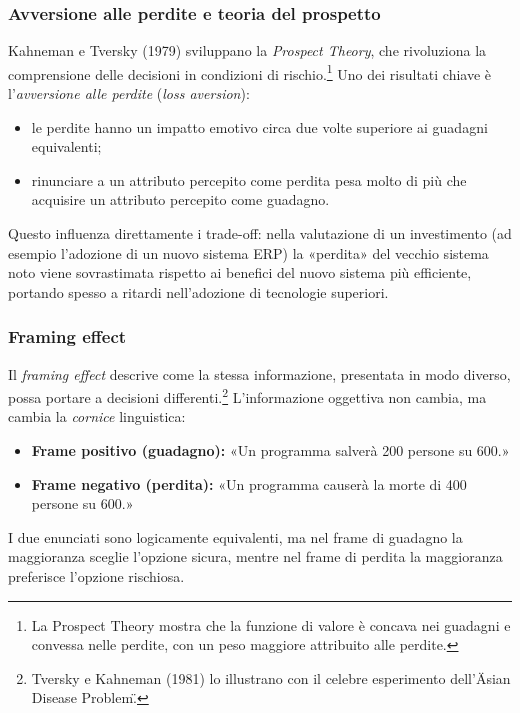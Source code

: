 \documentclass[a4paper,12pt]{article}
\begin{document}
	\subsubsection{Avversione alle perdite e teoria del prospetto}
	
	Kahneman e Tversky (1979) sviluppano la \emph{Prospect Theory}, che rivoluziona la comprensione delle decisioni in condizioni di rischio.\footnote{La Prospect Theory mostra che la funzione di valore è concava nei guadagni e convessa nelle perdite, con un peso maggiore attribuito alle perdite. }%
	Uno dei risultati chiave è l'\emph{avversione alle perdite} (\emph{loss aversion}):
	\begin{itemize}
		\item le perdite hanno un impatto emotivo circa due volte superiore ai guadagni equivalenti;
		\item rinunciare a un attributo percepito come perdita pesa molto di più che acquisire un attributo percepito come guadagno.
	\end{itemize}
	
	Questo influenza direttamente i trade-off: nella valutazione di un investimento (ad esempio l'adozione di un nuovo sistema ERP) la «perdita» del vecchio sistema noto viene sovrastimata rispetto ai benefici del nuovo sistema più efficiente, portando spesso a ritardi nell'adozione di tecnologie superiori. %
	
	\subsubsection{Framing effect}
	
	Il \emph{framing effect} descrive come la stessa informazione, presentata in modo diverso, possa portare a decisioni differenti.\footnote{Tversky e Kahneman (1981) lo illustrano con il celebre esperimento dell'\"Asian Disease Problem\". }%
	L'informazione oggettiva non cambia, ma cambia la \emph{cornice} linguistica:
	
	\begin{itemize}
		\item \textbf{Frame positivo (guadagno):} «Un programma salverà 200 persone su 600.»
		\item \textbf{Frame negativo (perdita):} «Un programma causerà la morte di 400 persone su 600.»
	\end{itemize}
	I due enunciati sono logicamente equivalenti, ma nel frame di guadagno la maggioranza sceglie l'opzione sicura, mentre nel frame di perdita la maggioranza preferisce l'opzione rischiosa.%
	
\end{document}
